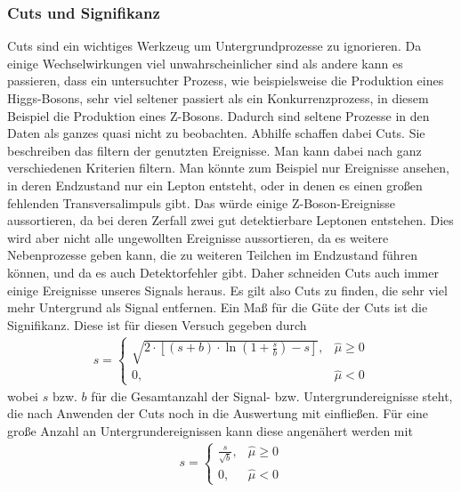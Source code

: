 \subsubsection{Cuts und Signifikanz}
Cuts sind ein wichtiges Werkzeug um Untergrundprozesse zu ignorieren.
Da einige Wechselwirkungen viel unwahrscheinlicher sind als andere kann es passieren, dass ein untersuchter Prozess, wie beispielsweise die Produktion eines Higgs-Bosons, sehr viel seltener passiert als ein Konkurrenzprozess, in diesem Beispiel die Produktion eines Z-Bosons.
Dadurch sind seltene Prozesse in den Daten als ganzes quasi nicht zu beobachten.
Abhilfe schaffen dabei Cuts.
Sie beschreiben das filtern der genutzten Ereignisse.
Man kann dabei nach ganz verschiedenen Kriterien filtern.
Man könnte zum Beispiel nur Ereignisse ansehen, in deren Endzustand nur ein Lepton entsteht, oder in denen es einen großen fehlenden Transversalimpuls gibt.
Das würde einige Z-Boson-Ereignisse aussortieren, da bei deren Zerfall zwei gut detektierbare Leptonen entstehen.
Dies wird aber nicht alle ungewollten Ereignisse aussortieren, da es weitere Nebenprozesse geben kann, die zu weiteren Teilchen im Endzustand führen können, und da es auch Detektorfehler gibt.
Daher schneiden Cuts auch immer einige Ereignisse unseres Signals heraus.
Es gilt also Cuts zu finden, die sehr viel mehr Untergrund als Signal entfernen.
Ein Maß für die Güte der Cuts ist die Signifikanz.
Diese ist für diesen Versuch gegeben durch
\begin{gather}
	s =
	\begin{cases}
		\sqrt{2 \cdot [(s+b) \cdot \ln{(1+\frac{s}{b})} - s]}, & \hat{\mu} \geq 0 \\
		0, & \hat{\mu} < 0
	\end{cases}
\end{gather}
wobei $s$ bzw. $b$ für die Gesamtanzahl der Signal- bzw. Untergrundereignisse steht, die nach Anwenden der Cuts noch in die Auswertung mit einfließen.
Für eine große Anzahl an Untergrundereignissen kann diese angenähert werden mit
\begin{gather}
s =
\begin{cases}
	\frac{s}{\sqrt{b}}, & \hat{\mu} \geq 0 \\
	0, & \hat{\mu} < 0
\end{cases}
\end{gather}
